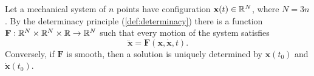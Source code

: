 \begin{theorem}\label{thm:newton-equation}
  Let a mechanical system of $n$ points have configuration
  $\mathbf x(t) \in \mathbb{R}^N$, where $N = 3n$. By the determinacy principle
  (\cref{def:determinacy}) there is a function
  $\mathbf F : \mathbb{R}^N \times \mathbb{R}^N \times \mathbb{R} \to \mathbb{R}^N$ such that every motion of
  the system satisfies
  \[
    \ddot{\mathbf x} = \mathbf F(\mathbf x, \dot{\mathbf x}, t).
  \]
  Conversely, if $\mathbf F$ is smooth, then a solution is uniquely determined by
  $\mathbf x(t_0)$ and $\dot{\mathbf x}(t_0)$.
\end{theorem}

